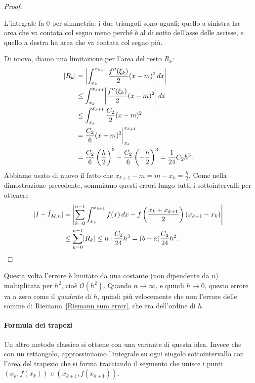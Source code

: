 \documentclass[a4paper]{report}
\DeclarePairedDelimiter{\abs}{\lvert}{\rvert}
\theoremstyle{definiton}
\theoremstyle{remark}
\begin{document}
\begin{proof}
\begin{center}
\end{center}
L'integrale fa $0$ per simmetria: i due triangoli sono uguali; quello a sinistra ha area che va contata col segno meno perché è al di sotto dell'asse delle ascisse, e quello a destra ha area che va contata col segno più.

Di nuovo, diamo una limitazione per l'area del resto $R_k$:
\begin{align*}
    \abs{R_k} &= \abs*{\int_{x_k}^{x_{k+1}} \frac{f''(\xi_k)}{2}(x-m)^2 \,dx}\\
    &\leq \int_{x_k}^{x_{k+1}} \abs*{\frac{f''(\xi_k)}{2}(x-m)^2} \, dx\\
    &\leq \int_{x_k}^{x_{k+1}} \frac{C_2}{2} (x-m)^2 \\
    & = \frac{C_2}{6} (x-m)^3\bigg|_{x_k}^{x_{k+1}}\\
    &= \frac{C_2}{6} \left(\frac{h}{2}\right)^3 - \frac{C_2}{6}\left(-\frac{h}{2}\right)^3 = \frac{1}{24}C_2 h^3.
\end{align*}
Abbiamo usato di nuovo il fatto che $x_{k+1}-m = m-x_k = \frac{h}{2}$. Come nella dimostrazione precedente, sommiamo questi errori lungo tutti i sottointervalli per ottenere
\begin{align*}
    \abs{I - \tilde{I}_{M,n}} &= \abs*{\sum_{k=0}^{n-1} \int_{x_k}^{x_{k+1}} f(x)\, dx - f\left(\frac{x_k+x_{k+1}}{2}\right)(x_{k+1}-x_k) }\\
    &\leq \sum_{k=0}^{n-1} \abs{R_k} \leq n \cdot \frac{C_2}{24}h^3 = (b-a)\frac{C_2}{24}h^2. \qedhere
\end{align*}
\end{proof}
Questa volta l'errore è limitato da una costante (non dipendente da $n$) moltiplicata per $h^2$, cioè $\mathcal{O}(h^2)$. Quando $n\to\infty$, e quindi $h\to 0$, questo errore va a zero come il \emph{quadrato} di $h$, quindi più velocemente che non l'errore delle somme di Riemann~\eqref{Riemann sum error}, che era dell'ordine di $h$. 

\paragraph{Formula dei trapezi} Un altro metodo classico si ottiene con una variante di questa idea. Invece che con un rettangolo, approssimiamo l'integrale su ogni singolo sottointervallo con l'area del trapezio che si forma tracciando il segmento che unisce i punti $(x_{k}, f(x_k))$ e $(x_{k+1}, f(x_{k+1}))$.
\end{document}
